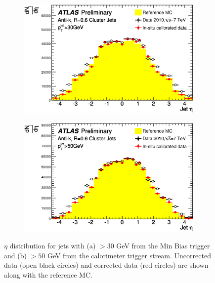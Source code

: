 \begin{figure}
\centering
        \begin{subfigure}[b]{0.5\textwidth}
                \centering
                \includegraphics[width=\textwidth]{figures/JetPerformance/EtaDist30GeV.eps}
        \end{subfigure}%
        \begin{subfigure}[b]{0.5\textwidth}
                \centering
                \includegraphics[width=\textwidth]{figures/JetPerformance/EtaDist50GeV.eps}
        \end{subfigure}%
\caption[Effect of additional calibration on the jet $\eta$ distribution]{
$\eta$ distribution for jets with (a) \pt{} $>30$ GeV from the Min Bias trigger and (b) \pt{} $>50$ GeV from the calorimeter trigger stream. 
Uncorrected data (open black circles) and corrected data (red circles) are shown along with the reference MC. 
\label{JetPerf:EtaData}}

\end{figure}
